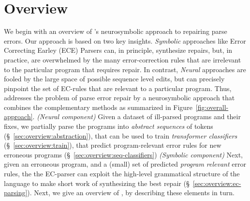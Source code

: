 \section{Overview}
\label{sec:overview}

We begin with an overview of \toolname's neurosymbolic
approach to repairing parse errors.
%
Our approach is based on two key insights.
%
\emph{Symbolic} approaches like Error Correcting
Earley (ECE) Parsers \citep{Aho_1972} can, in principle,
synthesize repairs, but, in practice, are overwhelmed by
the many error-correction rules that are irrelevant to the
particular program that requires repair.
%
In contrast, \emph{Neural} approaches are fooled by the large space of possible
sequence level edits, but can precisely pinpoint the set of EC-rules that are
relevant to a particular program.
%
Thus, \toolname addresses the problem of parse
error repair by a neurosymbolic approach that
combines the complementary methods as summarized
in Figure~\ref{fig:overall-approach}.
%
%
\emph{(Neural component)}
%
Given a dataset of ill-parsed programs and
their fixes, we partially parse the programs
into \emph{abstract sequences} of tokens
(\S~\ref{sec:overview:abstraction}), that can
be used to train \emph{transformer classifiers}
(\S~\ref{sec:overview:train}), that predict
program-relevant error rules for new erroneous
programs (\S~\ref{sec:overview:seq-classifiers})
%
\emph{(Symbolic component)}
%
Next, given an erroneous program, and a (small) set of
predicted \emph{program relevant} error rules, the
the EC-parser can exploit the high-level grammatical
structure of the language to make short work of
synthesizing the best repair (\S~\ref{sec:overview:ec-parsing}).
%
Next, we give an overview of \toolname, by describing these elements in turn.





